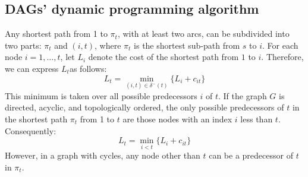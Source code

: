 \subsection*{DAGs' dynamic programming algorithm}
Any shortest path from 1 to $\pi_t$, with at least two arcs, can be subdivided into two parts: $\pi_t$ and $(i,t)$, where $\pi_t$ is the shortest sub-path from $s$ to $i$. 
For each node  $i=1,\dots,t$, let $L_i$ denote the cost of the shortest path from $1$ to $i$. 
Therefore, we can express $L_t$as follows:
\[L_t=\min_{(i,t) \in \delta^{-}(t)}\{L_i+c_{it}\}\]
This minimum is taken over all possible predecessors $i$ of $t$.
If the graph $G$ is directed, acyclic, and topologically ordered, the only possible predecessors of $t$ in the shortest path $\pi_t$ from 1 to $t$ are those nodes with an index $i$ less than $t$. 
Consequently:
\[L_t=\min_{i<t}\{L_i+c_{it}\}\]
However, in a graph with cycles, any node other than $t$ can be a predecessor of $t$ in $\pi_t$.  

